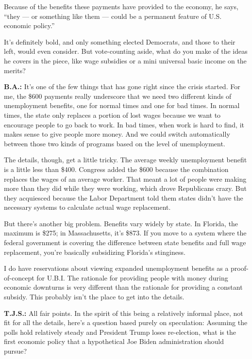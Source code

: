 Because of the benefits these payments have provided to the economy, he
says, ``they --- or something like them --- could be a permanent feature
of U.S. economic policy.''

It's definitely bold, and only something elected Democrats, and those to
their left, would even consider. But vote-counting aside, what do you
make of the ideas he covers in the piece, like wage subsidies or a mini
universal basic income on the merits?

\textbf{B.A.:} It's one of the few things that has gone right since the
crisis started. For me, the \$600 payments really underscore that we
need two different kinds of unemployment benefits, one for normal times
and one for bad times. In normal times, the state only replaces a
portion of lost wages because we want to encourage people to go back to
work. In bad times, when work is hard to find, it makes sense to give
people more money. And we could switch automatically between those two
kinds of programs based on the level of unemployment.

The details, though, get a little tricky. The average weekly
unemployment benefit is a little less than \$400. Congress added the
\$600 because the combination replaces the wages of an average worker.
That meant a lot of people were making more than they did while they
were working, which drove Republicans crazy. But they acquiesced because
the Labor Department told them states didn't have the necessary systems
to calculate actual wage replacement.

But there's another big problem. Benefits vary widely by state. In
Florida, the maximum is \$275; in Massachusetts, it's \$873. If you move
to a system where the federal government is covering the difference
between state benefits and full wage replacement, you're basically
subsidizing Florida's stinginess.

I do have reservations about viewing expanded unemployment benefits as a
proof-of-concept for U.B.I. The rationale for providing people with
money during economic downturns is very different than the rationale for
providing a constant subsidy. This probably isn't the place to get into
the details.

\textbf{T.J.S.:} All fair points. In the spirit of this being a
relatively informal place, not fit for all the details, here's a
question based purely on speculation: Assuming the polls hold relatively
steady and President Trump loses re-election, what is the first economic
policy that a hypothetical Joe Biden administration should pursue?

